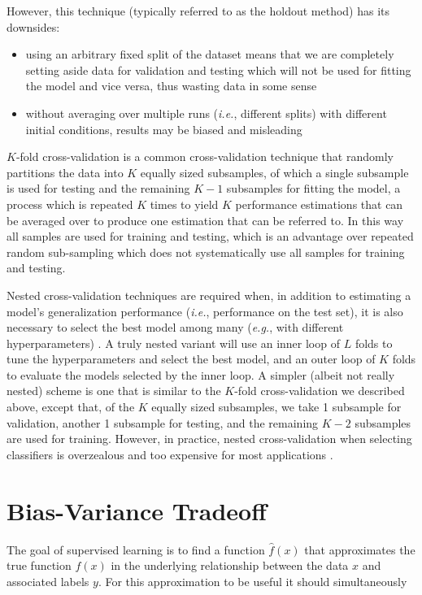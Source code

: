 However, this technique (typically referred to as the holdout method) has its downsides:

\begin{itemize}
    \item using an arbitrary fixed split of the dataset means that we are completely setting aside data for validation and testing which will not be used for fitting the model and vice versa, thus wasting data in some sense
    \item without averaging over multiple runs (\textit{i.e.}, different splits) with different initial conditions, results may be biased and misleading
\end{itemize}

$K$-fold cross-validation is a common cross-validation technique that randomly partitions the data into $K$ equally sized subsamples, of which a single subsample is used for testing and the remaining $K-1$ subsamples for fitting the model, a process which is repeated $K$ times to yield $K$ performance estimations that can be averaged over to produce one estimation that can be referred to. In this way all samples are used for training and testing, which is an advantage over repeated random sub-sampling which does not systematically use all samples for training and testing.

Nested cross-validation techniques are required when, in addition to estimating a model's generalization performance (\textit{i.e.}, performance on the test set), it is also necessary to select the best model among many (\textit{e.g.}, with different hyperparameters) \cite{crossvalidationbias}. A truly nested variant will use an inner loop of $L$ folds to tune the hyperparameters and select the best model, and an outer loop of $K$ folds to evaluate the models selected by the inner loop. A simpler (albeit not really nested) scheme is one that is similar to the $K$-fold cross-validation we described above, except that, of the $K$ equally sized subsamples, we take 1 subsample for validation, another 1 subsample for testing, and the remaining $K-2$ subsamples are used for training. However, in practice, nested cross-validation when selecting classifiers is overzealous and too expensive for most applications \cite{nestedcvoverzealous}.

\section{Bias-Variance Tradeoff}

The goal of supervised learning is to find a function $\hat{f}(x)$ that approximates the true function $f(x)$ in the underlying relationship between the data $x$ and associated labels $y$. For this approximation to be useful it should simultaneously

